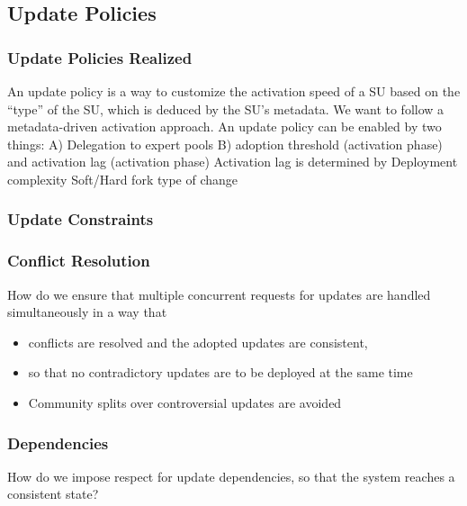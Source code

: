 \subsection{Update Policies} 
\subsubsection{Update Policies Realized}
An update policy is a way to customize the activation speed of a SU based on the “type” of the SU, which is deduced by the SU’s metadata. We want to follow a metadata-driven activation approach. 
An update policy can be enabled by two things:
A) Delegation to expert pools
B) adoption threshold (activation phase) and activation lag (activation phase)
Activation lag is determined by
Deployment complexity
Soft/Hard fork type of change

\subsubsection{Update Constraints}

\subsubsection*{Conflict Resolution}
How do we ensure that multiple concurrent requests for updates are handled simultaneously in a way that
\begin{itemize}
\item conflicts are resolved and the adopted updates are consistent, 
\item so that no contradictory updates are to be deployed at the same time
\item Community splits over controversial updates are avoided
\end{itemize}

\subsubsection*{Dependencies}
How do we impose respect for update dependencies, so that the system reaches a consistent state? 

